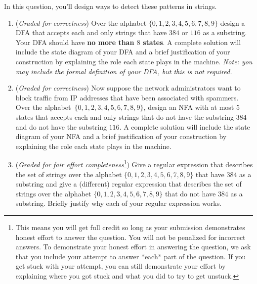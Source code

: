 \begin{enumerate}
In this question, you'll design ways to detect these patterns in strings.

\begin{enumerate}
    \item ({\it Graded for correctness})
    Over the alphabet $\{0,1,2,3,4,5,6,7,8,9\}$ design a DFA that accepts each and only strings
    that have $384$ or $116$ as a substring. Your DFA should have {\bf no more than $8$ states}.
    A complete solution will include the state diagram of your DFA and a brief justification of
    your construction by explaining the role each state plays in the machine. {\it Note: you may 
    include the formal definition of your DFA, but this is not required.} 
    \item ({\it Graded for correctness})
    Now suppose the network administrators want to block traffic from IP addresses
    that have been associated with spammers. Over the alphabet~$\{0,1,2,3,4,5,6,7,8,9\}$, 
    design an NFA with at most $5$ states that accepts each and only strings
    that do not have the substring $384$ and do not have the substring $116$. 
    A complete solution will include the state diagram of your NFA and a brief justification 
    of your construction by explaining the role each state plays in the machine.
    \item ({\it Graded for fair effort completeness}\footnote{This means 
    you will get full credit so long as your submission demonstrates honest 
    effort to answer the question. You will not be penalized for incorrect answers. 
    To demonstrate your honest effort in answering the question, we ask that you 
    include your attempt to answer *each* part of the question. If you get stuck 
    with your attempt, you can still demonstrate your effort by explaining where 
    you got stuck and what you did to try to get unstuck.})
    Give a regular expression that describes the set of strings over 
    the alphabet $\{0,1,2,3,4,5,6,7,8,9\}$ that have $384$ as a substring and give
    a (different) regular expression that describes the set of strings over
    the alphabet $\{0,1,2,3,4,5,6,7,8,9\}$ that do not have $384$ as a substring. Briefly justify
    why each of your regular expression works.
\end{enumerate}


\end{enumerate}
